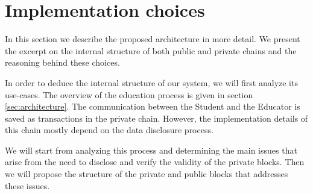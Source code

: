 
\section{Implementation choices}
In this section we describe the proposed architecture in more detail. We present the excerpt on the internal structure of both public and private chains and the reasoning behind these choices.

In order to deduce the internal structure of our system, we will first analyze its use-cases. The overview of the education process is given in section \ref{sec:architecture}. The communication between the Student and the Educator is saved as transactions in the private chain. However, the implementation details of this chain mostly depend on the data disclosure process.

We will start from analyzing this process and determining the main issues that arise from the need to disclose and verify the validity of the private blocks. Then we will propose the structure of the private and public blocks that addresses these issues.









